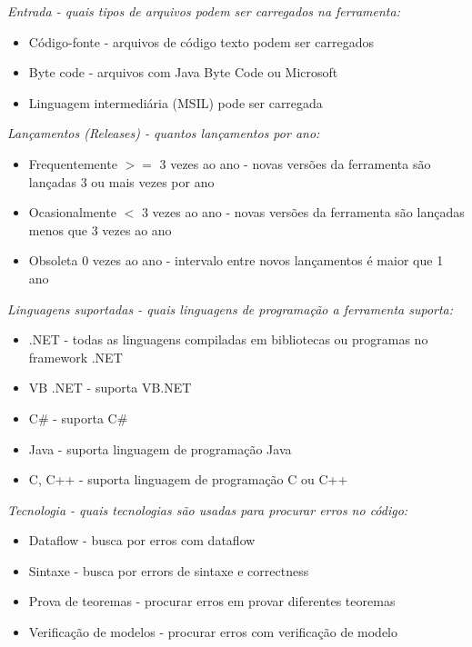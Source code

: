 \begin{description}

  \item {\it Entrada - quais tipos de arquivos podem ser carregados na ferramenta:}
    \begin{itemize}
      \item Código-fonte - arquivos de código texto podem ser carregados
      \item Byte code - arquivos com Java Byte Code ou Microsoft
      \item Linguagem intermediária (MSIL) pode ser carregada
    \end{itemize}

  \item {\it Lançamentos ({\it Releases}) - quantos lançamentos por ano:}
    \begin{itemize}
      \item Frequentemente $>=$ 3 vezes ao ano - novas versões da ferramenta são lançadas 3 ou mais vezes por ano
      \item Ocasionalmente $<$ 3 vezes ao ano - novas versões da ferramenta são lançadas menos que 3 vezes ao ano
      \item Obsoleta 0 vezes ao ano - intervalo entre novos lançamentos é maior que 1 ano
    \end{itemize}

  \item {\it Linguagens suportadas - quais linguagens de programação a ferramenta suporta:}
    \begin{itemize}
      \item .NET - todas as linguagens compiladas em bibliotecas ou programas no framework .NET
      \item VB .NET - suporta VB.NET
      \item C\# - suporta C\#
      \item Java - suporta linguagem de programação Java
      \item C, C++ - suporta linguagem de programação C ou C++
    \end{itemize}

  \item {\it Tecnologia - quais tecnologias são usadas para procurar erros no código:}
    \begin{itemize}
      \item Dataflow - busca por erros com dataflow
      \item Sintaxe - busca por errors de sintaxe e correctness
      \item Prova de teoremas - procurar erros em provar diferentes teoremas
      \item Verificação de modelos - procurar erros com verificação de modelo
    \end{itemize}


\end{description}
